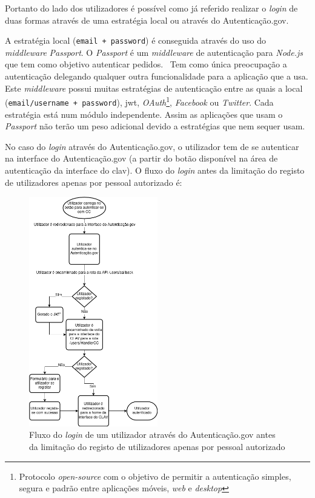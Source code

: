Portanto do lado dos utilizadores é possível como já referido realizar o \textit{login} de duas formas através de uma estratégia local ou através do Autenticação.gov.

A estratégia local (\texttt{email + password}) é conseguida através do uso do \textit{middleware} \textit{Passport}.
O \textit{Passport} é um \textit{middleware} de autenticação para \textit{Node.js} que tem como objetivo autenticar pedidos.~\cite{passport} Tem como única preocupação a autenticação delegando qualquer outra funcionalidade para a aplicação que a usa. Este \textit{middleware} possui muitas estratégias de autenticação entre as quais a local (\texttt{email/username + password}), \acrshort{jwt}, \textit{OAuth}\footnote{Protocolo \textit{open-source} com o objetivo de permitir a autenticação simples, segura e padrão entre aplicações móveis, \textit{web} e \textit{desktop}}, \textit{Facebook} ou \textit{Twitter}. Cada estratégia está num módulo independente. Assim as aplicações que usam o \textit{Passport} não terão um peso adicional devido a estratégias que nem sequer usam.

No caso do \textit{login} através do Autenticação.gov, o utilizador tem de se autenticar na interface do Autenticação.gov (a partir do botão disponível na área de autenticação da interface do \acrshort{clav}). O fluxo do \textit{login} antes da limitação do registo de utilizadores apenas por pessoal autorizado é:

\begin{figure}[H]
    \centering
    \includegraphics[width=0.5\textwidth]{img/authgov.png}
    \caption{Fluxo do \textit{login} de um utilizador através do Autenticação.gov antes da limitação do registo de utilizadores apenas por pessoal autorizado}\label{fig:authgov}
\end{figure}


